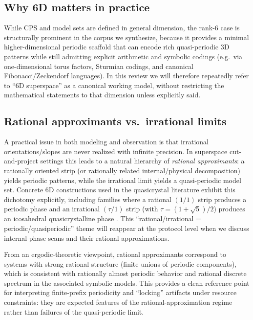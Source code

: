 \subsection{Why 6D matters in practice}\label{sec:superspace:6d}

While CPS and model sets are defined in general dimension, the rank-$6$ case is structurally prominent in the corpus we synthesize, because it provides a minimal higher-dimensional periodic scaffold that can encode rich quasi-periodic 3D patterns while still admitting explicit arithmetic and symbolic codings (e.g.\ via one-dimensional torus factors, Sturmian codings, and canonical Fibonacci/Zeckendorf languages). In this review we will therefore repeatedly refer to ``6D superspace'' as a canonical working model, without restricting the mathematical statements to that dimension unless explicitly said.

\subsection{Rational approximants vs.\ irrational limits}\label{sec:superspace:rational-irrational}

A practical issue in both modeling and observation is that irrational orientations/slopes are never realized with infinite precision. In superspace cut-and-project settings this leads to a natural hierarchy of \emph{rational approximants}: a rationally oriented strip (or rationally related internal/physical decomposition) yields periodic patterns, while the irrational limit yields a quasi-periodic model set. Concrete 6D constructions used in the quasicrystal literature exhibit this dichotomy explicitly, including families where a rational $(1/1)$ strip produces a periodic phase and an irrational $(\tau/1)$ strip (with $\tau=(1+\sqrt5)/2$) produces an icosahedral quasicrystalline phase \cite{PRB46_6091}. This ``rational/irrational = periodic/quasiperiodic'' theme will reappear at the protocol level when we discuss internal phase scans and their rational approximations.

\begin{remark}\label{rem:rational-discrete-spectrum}
From an ergodic-theoretic viewpoint, rational approximants correspond to systems with strong rational structure (finite unions of periodic components), which is consistent with rationally almost periodic behavior and rational discrete spectrum in the associated symbolic models.\cite{BergelsonKulagaPrzymusLemanczykRichter2019RationallyAlmostPeriodic} This provides a clean reference point for interpreting finite-prefix periodicity and ``locking'' artifacts under resource constraints: they are expected features of the rational-approximation regime rather than failures of the quasi-periodic limit.
\end{remark}

